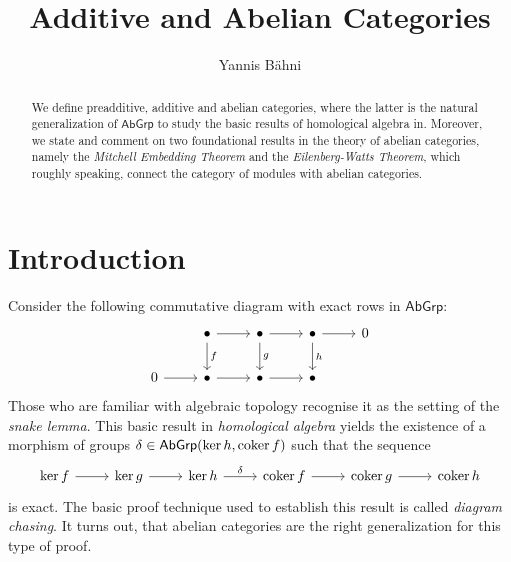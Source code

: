 

\title{Additive and Abelian Categories}
\author{Yannis B\"{a}hni}
\address[Yannis B\"{a}hni]{University of Zurich, R\"{a}mistrasse 71, 8006 Zurich}



\begin{abstract}
	We define preadditive, additive and abelian categories, where the latter is the natural generalization of $\mathsf{AbGrp}$ to study the basic results of homological algebra in. Moreover, we state and comment on two foundational results in the theory of abelian categories, namely the \emph{Mitchell Embedding Theorem} and the \emph{Eilenberg-Watts Theorem}, which roughly speaking, connect the category of modules with abelian categories.
\end{abstract}

\maketitle

\tableofcontents

\section{Introduction}
Consider the following commutative diagram with exact rows in $\mathsf{AbGrp}$:
\begin{equation*}
	\begin{tikzcd}
		& \bullet \arrow[r]\arrow[d,"f"] & \bullet \arrow[r]\arrow[d,"g"] & \bullet \arrow[r]\arrow[d,"h"] & 0\\
		0 \arrow[r] & \bullet \arrow[r] & \bullet \arrow[r] & \bullet
	\end{tikzcd}
\end{equation*}
Those who are familiar with algebraic topology recognise it as the setting of the \emph{snake lemma}. This basic result in \emph{homological algebra} yields the existence of a morphism of groups $\delta \in \mathsf{AbGrp}(\ker h,\operatorname{coker} f)$ such that the sequence
\begin{equation*}
	\begin{tikzcd}
			\ker f \arrow[r] & \ker g \arrow[r] & \ker h \arrow[r,"\delta"] & \coker f \arrow[r] & \coker g \arrow[r] & \coker h
	 \end{tikzcd}
\end{equation*}
\noindent is exact. The basic proof technique used to establish this result is called \emph{diagram chasing}. It turns out, that abelian categories are the right generalization for this type of proof.

